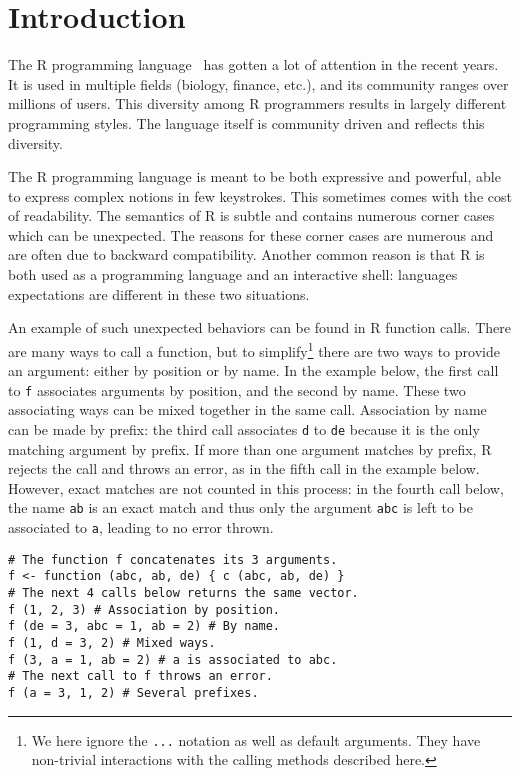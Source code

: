 \documentclass[
    sigplan,
    10pt,
    review, %
    natbib=false %
 ]{acmart}
\begin{document}

\maketitle

\section{Introduction}
\label{sec:intro}

The R programming language~\parencite{R, ihaka1996r, Rwebsite}
has gotten a lot of attention in the recent years.
It is used in multiple fields (biology, finance, etc.),
and its community ranges over millions of users.
This diversity among R programmers
results in largely different programming styles.
The language itself is community driven and reflects this diversity.

The R programming language is meant to be both expressive and powerful,
able to express complex notions in few keystrokes.
This sometimes comes with the cost of readability.
The semantics of R is subtle and contains numerous corner cases
which can be unexpected.
The reasons for these corner cases are numerous
and are often due to backward compatibility.
Another common reason is that R
is both used as a programming language and an interactive shell:
languages expectations are different in these two situations.

An example of such unexpected behaviors can be found
in R function calls.
There are many ways to call a function,
but to simplify\footnote{
    We here ignore the \texttt{...} notation
    as well as default arguments.
    They have non-trivial interactions with the calling methods
    described here.
} there are two ways to provide an argument:
either by position or by name.
In the example below, the first call to \texttt{f}
associates arguments by position, and the second by name.
These two associating ways can be mixed together in the same call.
%
Association by name can be made by prefix:
the third call associates \texttt{d} to \texttt{de}
because it is the only matching argument by prefix.
If more than one argument matches by prefix,
R rejects the call and throws an error,
as in the fifth call in the example below.
However, exact matches are not counted in this process:
in the fourth call below,
the name \texttt{ab} is an exact match
and thus only the argument \texttt{abc}
is left to be associated to \texttt{a},
leading to no error thrown.
\begin{verbatim}
# The function f concatenates its 3 arguments.
f <- function (abc, ab, de) { c (abc, ab, de) }
# The next 4 calls below returns the same vector.
f (1, 2, 3) # Association by position.
f (de = 3, abc = 1, ab = 2) # By name.
f (1, d = 3, 2) # Mixed ways.
f (3, a = 1, ab = 2) # a is associated to abc.
# The next call to f throws an error.
f (a = 3, 1, 2) # Several prefixes.
\end{verbatim}
\end{document}
